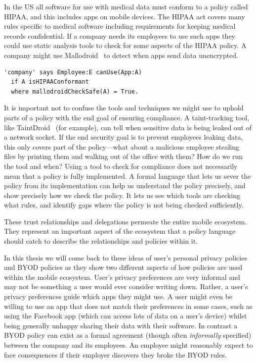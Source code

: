 \documentclass[thesis.tex]{subfiles}
\begin{document}
In the US all software for use with medical data must conform to a policy
called \ac{HIPAA}, and this includes apps on mobile devices.  The \ac{HIPAA}
act covers many rules specific to medical software including requirements for
keeping medical records confidential.  If a company needs its employees to use
such apps they could use static analysis tools to check for some aspects of the
\ac{HIPAA} policy.  A company might use Mallodroid~\cite{fahl_why_2012} to
detect when apps send data unencrypted.  
%
\begin{lstlisting} 
'company' says Employee:E canUse(App:A) 
  if A isHIPAAConformant 
  where mallodroidCheckSafe(A) = True. 
\end{lstlisting}


It is important not to confuse the tools and techniques we might use to uphold
parts of a policy with the end goal of ensuring compliance.
%
A taint-tracking tool, like TaintDroid~\cite{enck_taintdroid_2010} (for
example), can tell when sensitive data is being leaked out of a network socket.
If the end security goal is to prevent employees leaking data, this only covers
part of the policy---what about a malicious employee stealing files by printing
them and walking out of the office with them?  How do we run the tool and when?
Using a tool to check for compliance does not necessarily mean that a policy is
fully implemented.
%
A formal language that lets us sever the policy from its implementation can
help us understand the policy precisely, and show precisely how we check
the policy.  It lets us see which tools are checking what rules, and identify
gaps where the policy is not being checked sufficiently.

These trust relationships and delegations permeate the entire mobile
ecosystem.  They represent an important aspect of the ecosystem that a
policy language should catch to describe the
relationships and policies within it.

In this thesis we will come back to these ideas of user's personal
privacy policies and \ac{BYOD} policies as they show two different aspects
of how policies are used within the mobile ecosystem.
%
User's privacy preferences are very informal and may not be something
a user would ever consider writing down.  Rather, a user's privacy
preferences guide which apps they might use. A user might even be
willing to use an app that does not match their preferences in some
cases, such as using the Facebook app (which can access lots of data
on a user's device) whilst being generally unhappy sharing their data
with their software.
%
In contrast a \ac{BYOD} policy can exist as a formal agreement (though
often \emph{informally} specified) between the company and its
employees.  An employee might reasonably expect to face consequences
if their employer discovers they broke the \ac{BYOD} rules.
\end{document}
